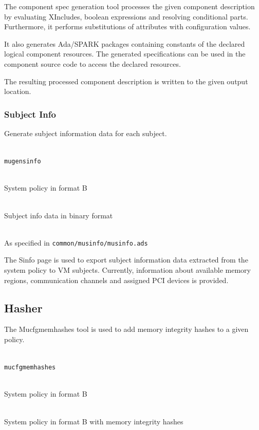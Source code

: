 \documentclass[a4paper,twoside,titlepage]{article}
\begin{document}
The component spec generation tool processes the given component description by
evaluating XIncludes, boolean expressions and resolving conditional parts.
Furthermore, it performs substitutions of attributes with configuration values.

It also generates Ada/SPARK packages containing constants of the declared
logical component resources. The generated specifications can be used in the
component source code to access the declared resources.

The resulting processed component description is written to the given output
location.

\subsubsection{Subject Info}
Generate subject information data for each subject.

\begin{description} \itemsep1pt \parskip0pt
	\item[Name] \hfill \\
		\texttt{mugensinfo}
	\item[Input] \hfill \\
		System policy in format B
	\item[Output] \hfill \\
		Subject info data in binary format
	\item[Output format] \hfill \\
		As specified in \texttt{common/musinfo/musinfo.ads}
\end{description}

The Sinfo page is used to export subject information data extracted from the
system policy to VM subjects. Currently, information about available memory
regions, communication channels and assigned PCI devices is provided.

\subsection{Hasher}
The Mucfgmemhashes tool is used to add memory integrity hashes to a given
policy.

\begin{description} \itemsep1pt \parskip0pt
	\item[Name] \hfill \\
		\texttt{mucfgmemhashes}
	\item[Input] \hfill \\
		System policy in format B
	\item[Output] \hfill \\
		System policy in format B with memory integrity hashes
\end{description}
\end{document}
